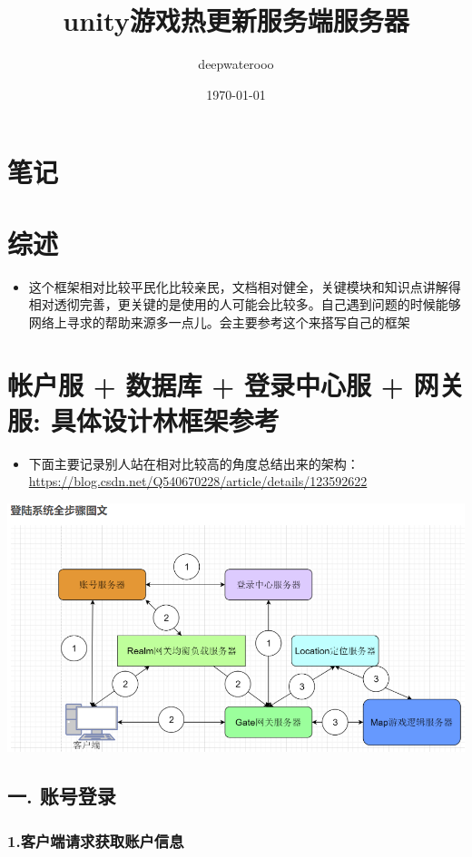 \documentclass[9pt, b5paper]{article}
\author{deepwaterooo}
\date{\today}
\title{unity游戏热更新服务端服务器}
\begin{document}
\maketitle
\tableofcontents


\section{笔记}
\label{sec-1}
\section{综述}
\label{sec-2}
\begin{itemize}
\item 这个框架相对比较平民化比较亲民，文档相对健全，关键模块和知识点讲解得相对透彻完善，更关键的是使用的人可能会比较多。自己遇到问题的时候能够网络上寻求的帮助来源多一点儿。会主要参考这个来搭写自己的框架
\end{itemize}

\section{帐户服 + 数据库 + 登录中心服 + 网关服: 具体设计林框架参考}
\label{sec-3}
\begin{itemize}
\item 下面主要记录别人站在相对比较高的角度总结出来的架构：\url{https://blog.csdn.net/Q540670228/article/details/123592622}
\end{itemize}

\includegraphics[width=.9\linewidth]{./pic/readme_20230124_102951.png}
\subsection{一. 账号登录}
\label{sec-3-1}
\subsubsection{1.客户端请求获取账户信息}
\label{sec-3-1-1}
\end{document}
